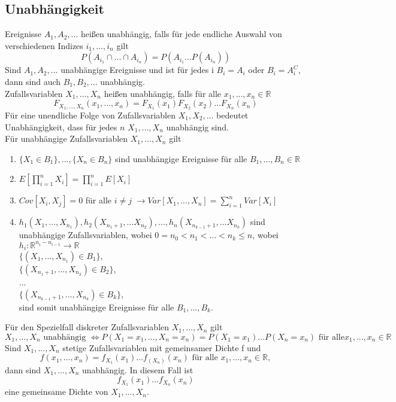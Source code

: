\documentclass[a4paper,12pt]{article}
\begin{document}
\subsection{Unabhängigkeit}
Ereignisse $A_1, A_2, ...$ heißen unabhängig, falls für jede endliche Auswahl von verschiedenen Indizes $i_1, ..., i_n$ gilt
$$
P(A_{i_1} \cap ... \cap A_{i_n}) = P(A_{i_1}...P(A_{i_n}))
$$
Sind $A_1, A_2, ...$ unabhängige Ereignisse und ist für jedes i $B_i = A_i$ oder $B_i = A_i^C$, dann sind auch $B_1, B_2, ...$ unabhängig.\\
Zufallsvariablen $X_1, ..., X_n$ heißen unabhängig, falls für alle $x_1, ..., x_n \in \mathbb{R}$ 
$$
F_{X_1, ..., X_n}(x_1, ..., x_n) = F_{X_1}(x_1)F_{X_2}(x_2)...F_{X_n}(x_n)
$$
Für eine unendliche Folge von Zufallsvariablen $X_1, X_2, ...$ bedeutet Unabhängigkeit, dass für jedes $n$ $X_1, ..., X_n$ unabhängig sind.\\
Für unabhängige Zufallsvariablen $X_1, ..., X_n$ gilt
\begin{enumerate}
	\item $\{X_1 \in B_1\}, ..., \{ X_n \in B_n \}$ sind unabhängige Ereignisse für alle $B_1, ..., B_n \in \mathbb{R}$
	\item $E \left[\prod_{i=1  }^{n}X_i    \right] = \prod_{i=1}^{n}E[X_i]$
	\item $Cov[X_i,X_j] = 0$ für alle $i \neq j$ $\rightarrow Var[X_1, ..., X_n] = \sum_{i=1}^{n} Var[X_i]$
	\item $h_1(X_1, ..., X_{n_1}), h_2(X_{n_1+1}, ... X_{n_2}), ..., h_n(X_{n_{k-1}+1}, ... X_{n_k})$ sind unabhängige Zufallsvariablen, wobei $0 = n_0 < n_1 < ... < n_k \leq n$, wobei $h_i: \mathbb{R}^{n_i - n_{i-1}} \to \mathbb{R}$\\
	$\{(X_1, ..., X_{n_1}) \in B_1     \}$, \\
	$\{(X_{n_1+1}, ..., X_{n_2}) \in B_2     \}$, \\
	... \\
	$\{(X_{n_{k-1}+1}, ..., X_{n_k}) \in B_k     \}$, \\
	sind somit unabhängige Ereignisse für alle $B_1, ..., B_k$.
\end{enumerate}
Für den Spezielfall diskreter Zufallsvariablen $X_1, ..., X_n$ gilt 
$$
X_1, ..., X_n \text{ unabhängig } \Leftrightarrow P(X_1 =x_1, ..., X_n=x_n) = P(X_1=x_1)...P(X_n=x_n) \text{ für alle} x_1, ..., x_n \in \mathbb{R}
$$
Sind $X_1, ..., X_n$ stetige Zufallsvariablen mit gemeinsamer Dichte f und $$f(x_1, ..., x_n) = f_{X_1}(x_1)...f_(X_n)(x_n) \text{ für alle } x_1, ..., x_n \in \mathbb{R},$$
dann sind $X_1, ..., X_n$ unabhängig. In diesem Fall ist 
$$
f_{X_1}(x_1)...f_{X_n}(x_n)
$$
eine gemeinsame Dichte von $X_1, ..., X_n$.
\end{document}
